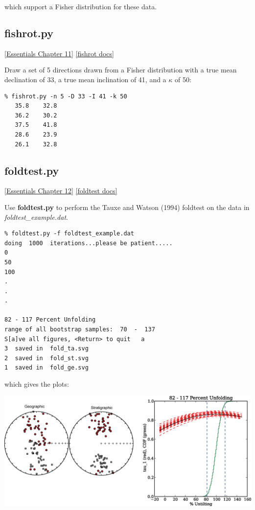 \documentclass[11pt]{book}
\begin{document}
{{{\noindent which support a Fisher distribution for these data.  



\subsection{fishrot.py} 
\href{http://magician.ucsd.edu/Essentials_2/WebBook2ch11.html#ch11}{ [Essentials Chapter 11]}
\href{http://earthref.org/PmagPy/pmagpydocs/fishrot-module.html}{[fishrot docs]}

Draw a set of 5 directions drawn  from a Fisher distribution with a true mean declination of 33, a true mean inclination of 41, and a $\kappa$ of  50:

\begin{verbatim}
% fishrot.py -n 5 -D 33 -I 41 -k 50
   35.8    32.8 
   36.2    30.2 
   37.5    41.8 
   28.6    23.9 
   26.1    32.8 
   \end{verbatim}

 \subsection{foldtest.py}
 \href{http://magician.ucsd.edu/Essentials_2/WebBook2ch12.html#ch12}{[Essentials Chapter 12]}
 \href{http://earthref.org/PmagPy/pmagpydocs/foldtest-module.html}{[foldtest docs]}

 Use {\bf foldtest.py} to perform the Tauxe and Watson (1994) \nocite{tauxe94}  foldtest on the data in {\it foldtest\_example.dat}.   
 
 \begin{verbatim}
% foldtest.py -f foldtest_example.dat 
doing  1000  iterations...please be patient.....
0
50
100
.
.
.

82 - 117 Percent Unfolding
range of all bootstrap samples:  70  -  137
S[a]ve all figures, <Return> to quit   a
3  saved in  fold_ta.svg
2  saved in  fold_st.svg
1  saved in  fold_ge.svg
 \end{verbatim}
 
\noindent  which gives the plots:
 
 {%
   \includegraphics[width=15cm]{EPSfiles/foldtest-ex.eps}}
 
}}}
\end{document}
